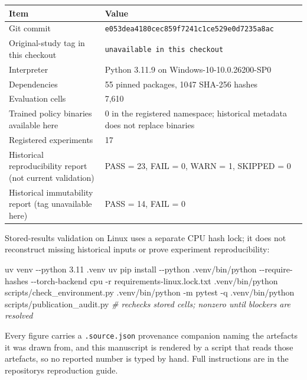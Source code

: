 \documentclass[
]{article}
\newenvironment{Shaded}{}{}
\newcommand{\AttributeTok}[1]{\textcolor[rgb]{0.49,0.56,0.16}{#1}}
\newcommand{\CommentTok}[1]{\textcolor[rgb]{0.38,0.63,0.69}{\textit{#1}}}
\newcommand{\ExtensionTok}[1]{#1}
\newcommand{\NormalTok}[1]{#1}
\begin{document}
\begin{longtable}[]{@{}ll@{}}
\toprule\noalign{}
Item & Value \\
\midrule\noalign{}
\endhead
\bottomrule\noalign{}
\endlastfoot
Git commit & \texttt{e053dea4180cec859f7241c1ce529e0d7235a8ac} \\
Original-study tag in this checkout &
\texttt{unavailable\ in\ this\ checkout} \\
Interpreter & Python 3.11.9 on Windows-10-10.0.26200-SP0 \\
Dependencies & 55 pinned packages, 1047 SHA-256 hashes \\
Evaluation cells & 7,610 \\
Trained policy binaries available here & 0 in the registered namespace;
historical metadata does not replace binaries \\
Registered experiments & 17 \\
Historical reproducibility report (not current validation) & PASS = 23,
FAIL = 0, WARN = 1, SKIPPED = 0 \\
Historical immutability report (tag unavailable here) & PASS = 14, FAIL
= 0 \\
\end{longtable}

Stored-results validation on Linux uses a separate CPU hash lock; it
does not reconstruct missing historical inputs or prove experiment
reproducibility:

\begin{Shaded}
\begin{Highlighting}[]
\ExtensionTok{uv}\NormalTok{ venv }\AttributeTok{{-}{-}python}\NormalTok{ 3.11 .venv}
\ExtensionTok{uv}\NormalTok{ pip install }\AttributeTok{{-}{-}python}\NormalTok{ .venv/bin/python }\AttributeTok{{-}{-}require{-}hashes} \AttributeTok{{-}{-}torch{-}backend}\NormalTok{ cpu }\AttributeTok{{-}r}\NormalTok{ requirements{-}linux.lock.txt}
\ExtensionTok{.venv/bin/python}\NormalTok{ scripts/check\_environment.py}
\ExtensionTok{.venv/bin/python} \AttributeTok{{-}m}\NormalTok{ pytest }\AttributeTok{{-}q}
\ExtensionTok{.venv/bin/python}\NormalTok{ scripts/publication\_audit.py  }\CommentTok{\# rechecks stored cells; nonzero until blockers are resolved}
\end{Highlighting}
\end{Shaded}

Every figure carries a \texttt{.source.json} provenance companion naming
the artefacts it was drawn from, and this manuscript is rendered by a
script that reads those artefacts, so no reported number is typed by
hand. Full instructions are in the repository\textquotesingle s
reproduction guide.
\end{document}
